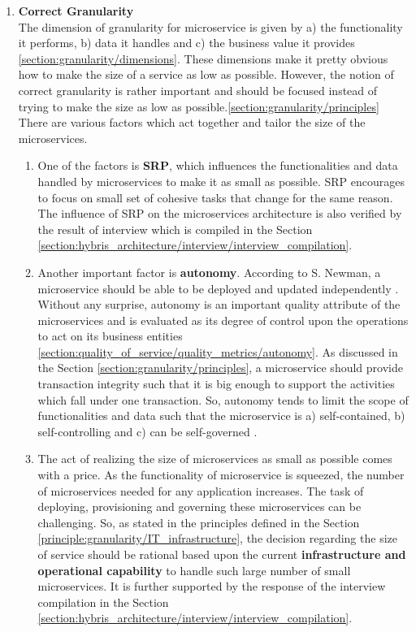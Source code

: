 \begin{enumerate}
\item \textbf{Correct Granularity} \\
The dimension of granularity for microservice is given by a) the functionality it performs, b) data it handles and  c) the business value it provides \ref{section:granularity/dimensions}. These dimensions make it pretty obvious how to make the size of a service as low as possible. However, the notion of correct granularity is rather important and should be focused instead of trying to make the size as low as possible.\ref{section:granularity/principles} There are various factors which act together and tailor the size of the microservices.
\begin{enumerate}
\item One of the factors is \textbf{\acrshort{SRP}}, which influences the functionalities and data handled by microservices to make it as small as possible. \acrshort{SRP} encourages to focus on small set of cohesive tasks that change for the same reason. \cite{Stine:2014aa} \cite{Newman:2015aa} The influence of \acrshort{SRP} on the microservices architecture is also verified by the result of interview which is compiled in the Section \ref{section:hybris_architecture/interview/interview_compilation}.
\item Another important factor is \textbf{autonomy}. According to S. Newman, a microservice should be able to be deployed and updated independently \cite{Newman:2015aa}. Without any surprise, autonomy is an important quality attribute of the microservices and is evaluated as its degree of control upon the operations to act on its business entities \ref{section:quality_of_service/quality_metrics/autonomy}. As discussed in the Section \ref{section:granularity/principles}, a microservice should provide transaction integrity such that it is big enough to support the activities which fall under one transaction. So, autonomy tends to limit the scope of functionalities and data such that the microservice is a) self-contained, b) self-controlling and c) can be self-governed \cite{Ma:2007aa}.
\item The act of realizing the size of microservices as small as possible comes with a price. As the functionality of microservice is squeezed, the number of microservices needed for any application increases. The task of deploying, provisioning and governing these microservices can be challenging. So, as stated in the principles defined in the Section  \ref{principle:granularity/IT_infrastructure},  the decision regarding the size of service should be rational based upon the current \textbf{infrastructure and operational capability} to handle such large number of small microservices. It is further supported by the response of the interview compilation in the Section \ref{section:hybris_architecture/interview/interview_compilation}.

\end{enumerate}
\end{enumerate}
